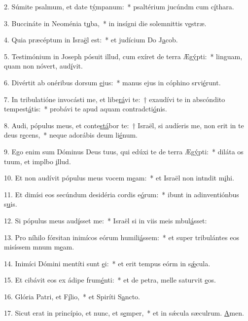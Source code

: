 2. Súmite psalmum, et date t\uline{ý}mpanum:~* psaltérium jucúndm cum c\uline{í}thara.\par 
3. Buccináte in Neoménia t\uline{u}ba,~* in insígni die solemnittis v\uline{e}stræ.\par 
4. Quia præcéptum in Isra\uline{ë}l est:~* et judícium Do J\uline{a}cob.\par 
5. Testimónium in Joseph pósuit illud, cum exíret de terra Æg\uline{ý}pti:~* linguam, quam non nóvert, aud\uline{í}vit.\par 
6. Divértit ab onéribus dorsum \uline{e}jus:~* manus ejus in cóphino srvi\uline{é}runt.\par 
7. In tribulatióne invocásti me, et libe\uline{rá}vi te:~† exaudívi te in abscóndito tempest\uline{á}tis:~* probávi te apud aquam contradcti\uline{ó}nis.\par 
8. Audi, pópulus meus, et conte\uline{stá}bor te:~† Israël, si audíeris me, non erit in te deus r\uline{e}cens,~* neque adorábis deum li\uline{é}num.\par 
9. Ego enim sum Dóminus Deus tuus, qui edúxi te de terra Æg\uline{ý}pti:~* diláta os tuum, et implbo \uline{i}llud.\par 
10. Et non audívit pópulus meus vocem m\uline{e}am:~* et Israël non intndit m\uline{i}hi.\par 
11. Et dimísi eos secúndum desidéria cordis e\uline{ó}rum:~* ibunt in adinventiónbus s\uline{u}is.\par 
12. Si pópulus meus aud\uline{í}sset me:~* Israël si in viis meis mbul\uline{á}sset:\par 
13. Pro níhilo fórsitan inimícos eórum humili\uline{á}ssem:~* et super tribulántes eos misíssem mnum m\uline{e}am.\par 
14. Inimíci Dómini mentíti sunt \uline{e}i:~* et erit tempus eórm in s\uline{ǽ}cula.\par 
15. Et cibávit eos ex ádipe frum\uline{é}nti:~* et de petra, melle saturvit \uline{e}os.\par 
16. Glória Patri, et F\uline{í}lio,~* et Spiríti S\uline{a}ncto.\par 
17. Sicut erat in princípio, et nunc, et s\uline{e}mper,~* et in sǽcula sæculrum. \uline{A}men.\par 

